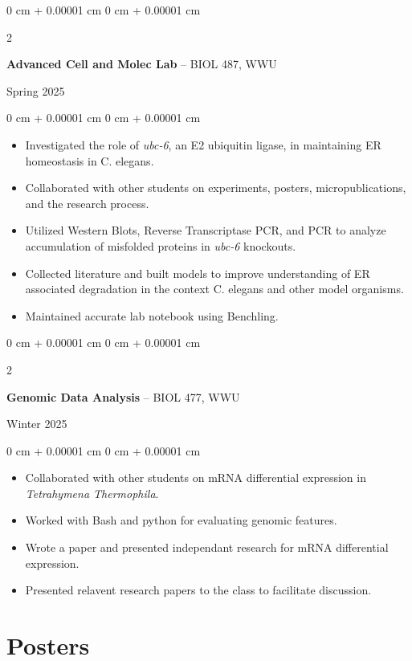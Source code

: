 \documentclass[10pt, article]{article}
\newenvironment{highlights}{
    \begin{itemize}[
        topsep=0.10 cm,
        parsep=0.10 cm,
        partopsep=0pt,
        itemsep=0pt,
        leftmargin=0 cm + 10pt
    ]
}{
    \end{itemize}
} %
\newenvironment{onecolentry}{
    \begin{adjustwidth}{
        0 cm + 0.00001 cm
    }{
        0 cm + 0.00001 cm
    }
}{
    \end{adjustwidth}
} %
\newenvironment{twocolentry}[2][]{
    \onecolentry
    \def\secondColumn{#2}
    \setcolumnwidth{\fill, 4.5 cm}
    \begin{paracol}{2}
}{
    \switchcolumn \raggedleft \secondColumn
    \end{paracol}
    \endonecolentry
} %
\begin{document}
    \begin{samepage}
    \begin{twocolentry}
      {Spring 2025}
      \textbf{Advanced Cell and Molec Lab} -- BIOL 487, WWU
    \end{twocolentry}
      \begin{onecolentry}
        \begin{highlights}
        \item Investigated the role of \textit{ubc-6}, an E2 ubiquitin ligase, in maintaining ER homeostasis in C. elegans. 
        \item Collaborated with other students on experiments, posters, micropublications, and the research process.
        \item Utilized Western Blots, Reverse Transcriptase PCR, and PCR to analyze accumulation of misfolded proteins in \textit{ubc-6} knockouts.
        \item Collected literature and built models to improve understanding of ER associated degradation in the context C. elegans and other model organisms.
        \item Maintained accurate lab notebook using Benchling.
        \end{highlights}
      \end{onecolentry}

    \begin{twocolentry}
      {Winter 2025}
       \textbf{Genomic Data Analysis} -- BIOL 477, WWU
    \end{twocolentry}
      \begin{onecolentry}
        \begin{highlights}
        \item Collaborated with other students on mRNA differential expression in \textit{Tetrahymena Thermophila}.
        \item Worked with Bash and python for evaluating genomic features.
        \item Wrote a paper and presented independant research for mRNA differential expression.
        \item Presented relavent research papers to the class to facilitate discussion.
        \end{highlights}
      \end{onecolentry}

    \end{samepage}

    \section{Posters}
\end{document}
